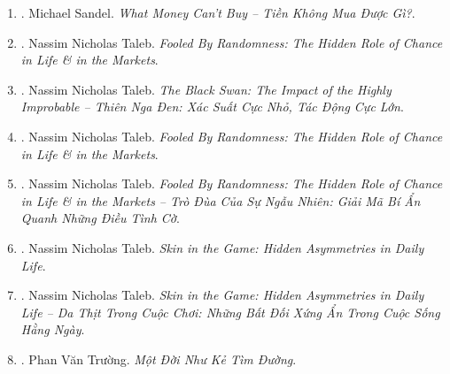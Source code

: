 \documentclass{article}
\begin{document}
\begin{enumerate}
	\item \cite{Sandel_money}. Michael Sandel. {\it What Money Can't Buy -- Tiền Không Mua Được Gì?}.\hfill{\sf[done]}
	
	\item \cite{Taleb_randomness}. Nassim Nicholas Taleb. {\it Fooled By Randomness: The Hidden Role of Chance in Life \& in the Markets}.\hfill{\sf[reading]}
	
	\item \cite{Taleb_black_swan_VN}. Nassim Nicholas Taleb. {\it The Black Swan: The Impact of the Highly Improbable -- Thiên Nga Đen: Xác Suất Cực Nhỏ, Tác Động Cực Lớn}.\hfill{\sf[reading]}
	
	\item \cite{Taleb_randomness}. Nassim Nicholas Taleb. {\it Fooled By Randomness: The Hidden Role of Chance in Life \& in the Markets}.
	
	\item \cite{Taleb_randomness_VN}. Nassim Nicholas Taleb. {\it Fooled By Randomness: The Hidden Role of Chance in Life \& in the Markets -- Trò Đùa Của Sự Ngẫu Nhiên: Giải Mã Bí Ẩn Quanh Những Điều Tình Cờ}.\hfill{\sf[done]}
	
	\item \cite{Taleb_skin_game}. Nassim Nicholas Taleb. {\it Skin in the Game: Hidden Asymmetries in Daily Life}.
	
	\item \cite{Taleb_skin_game_VN}. Nassim Nicholas Taleb. {\it Skin in the Game: Hidden Asymmetries in Daily Life -- Da Thịt Trong Cuộc Chơi: Những Bất Đối Xứng Ẩn Trong Cuộc Sống Hằng Ngày}.\hfill{\sf[reading]}
	
	\item \cite{Truong_ke_tim_duong}. Phan Văn Trường. {\it Một Đời Như Kẻ Tìm Đường}.\hfill{\sf[done]}
\end{enumerate}


\printbibliography[heading=bibintoc]
\end{document}
